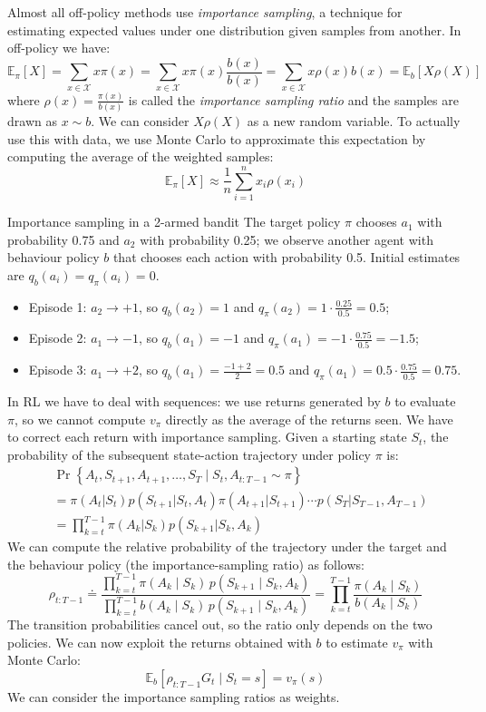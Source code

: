 Almost all off-policy methods use \textit{importance sampling}, a technique for estimating expected values under one distribution given samples from another.
In off-policy we have: 
\[
\mathbb{E}_{\pi}[X]
= \sum_{x \in \mathcal{X}} x\pi(x)
= \sum_{x \in \mathcal{X}} x\pi(x)\frac{b(x)}{b(x)}
= \sum_{x \in \mathcal{X}} x\rho(x)b(x)
= \mathbb{E}_{b}[X\rho(X)]
\]
where $\rho(x)=\frac{\pi(x)}{b(x)}$ is called the \textit{importance sampling ratio} and the samples are drawn as $x\sim b$. We can consider $X\rho(X)$ as a new random variable.
To actually use this with data, we use Monte Carlo to approximate this expectation by computing the average of the weighted samples:
\[
\mathbb{E}_{\pi}[X] \approx \frac{1}{n} \sum_{i=1}^{n} x_i \rho(x_i)
\]
\begin{esempio}{Importance sampling in a 2-armed bandit}
The target policy $\pi$ chooses $a_1$ with probability 0.75 and $a_2$ with probability 0.25; we observe another agent with behaviour policy $b$ that chooses each action with probability 0.5. Initial estimates are $q_b(a_i)=q_\pi(a_i)=0$.
\begin{itemize}
    \item Episode 1: $a_2\to+1$, so $q_b(a_2)=1$ and $q_\pi(a_2)=1\cdot\frac{0.25}{0.5}=0.5$;
    \item Episode 2: $a_1\to-1$, so $q_b(a_1)=-1$ and $q_\pi(a_1)=-1\cdot\frac{0.75}{0.5}=-1.5$;
    \item Episode 3: $a_1\to+2$, so $q_b(a_1)=\frac{-1+2}{2}=0.5$ and $q_\pi(a_1)=0.5\cdot\frac{0.75}{0.5}=0.75$.
\end{itemize}
\end{esempio}

In RL we have to deal with sequences: we use returns generated by $b$ to evaluate $\pi$, so we cannot compute $v_\pi$ directly as the average of the returns seen. We have to correct each return with importance sampling.
Given a starting state $S_t$, the probability of the subsequent state-action trajectory under policy $\pi$ is:
\begin{equation}
  \begin{split}
    &\Pr\left\{A_t,S_{t+1},A_{t+1},\dots,S_T\mid S_t,A_{t:T-1}\sim\pi\right\}\\
    &=\pi(A_t|S_t)p(S_{t+1}|S_t,A_t)\pi(A_{t+1}|S_{t+1})\cdots p(S_T|S_{T-1},A_{T-1})\\
    &=\prod_{k=t}^{T-1} \pi(A_k|S_k)p(S_{k+1}|S_k,A_k)
  \end{split}
\end{equation}
We can compute the relative probability of the trajectory under the target and the behaviour policy (the importance-sampling ratio) as follows:
\[
\rho_{t:T-1}
\doteq
\frac{
\prod_{k=t}^{T-1} \pi(A_k \mid S_k)\,p(S_{k+1} \mid S_k,A_k)
}{
\prod_{k=t}^{T-1} b(A_k \mid S_k)\,p(S_{k+1} \mid S_k,A_k)
}
=
\prod_{k=t}^{T-1}
\frac{\pi(A_k \mid S_k)}{b(A_k \mid S_k)}
\]
The transition probabilities cancel out, so the ratio only depends on the two policies. We can now exploit the returns obtained with $b$ to estimate $v_\pi$ with Monte Carlo:
\[\mathbb{E}_b[\rho_{t:T-1}G_t\mid S_t=s]=v_\pi(s)\]
We can consider the importance sampling ratios as weights. 


